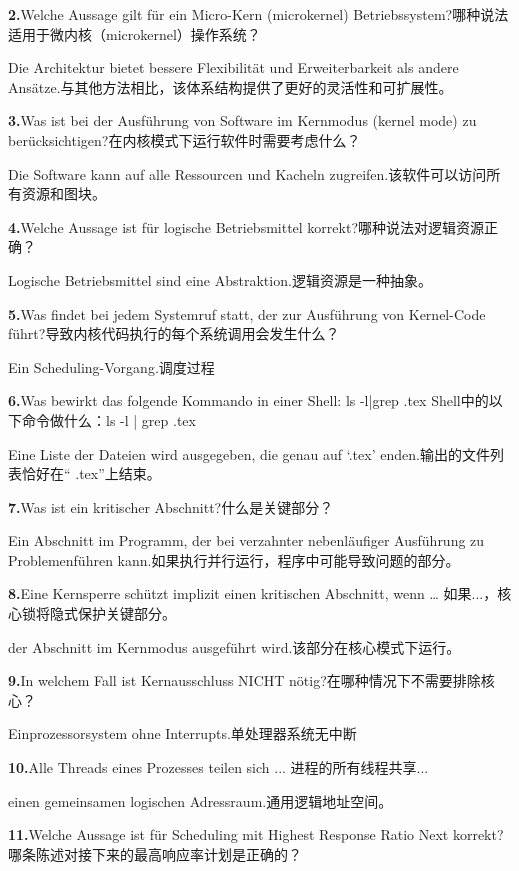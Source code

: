\documentclass[fleqn]{article}
\begin{document}
\textbf{2.}Welche Aussage gilt für ein Micro-Kern (microkernel) Betriebssystem?哪种说法适用于微内核（microkernel）操作系统？

Die Architektur bietet bessere Flexibilität und Erweiterbarkeit als andere Ansätze.与其他方法相比，该体系结构提供了更好的灵活性和可扩展性。

\textbf{3.}Was ist bei der Ausführung von Software im Kernmodus (kernel mode) zu berücksichtigen?在内核模式下运行软件时需要考虑什么？

Die Software kann auf alle Ressourcen und Kacheln zugreifen.该软件可以访问所有资源和图块。

\textbf{4.}Welche Aussage ist für logische Betriebsmittel korrekt?哪种说法对逻辑资源正确？

Logische Betriebsmittel sind eine Abstraktion.逻辑资源是一种抽象。

\textbf{5.}Was findet bei jedem Systemruf statt, der zur Ausführung von Kernel-Code führt?导致内核代码执行的每个系统调用会发生什么？

Ein Scheduling-Vorgang.调度过程

\textbf{6.}Was bewirkt das folgende Kommando in einer Shell: ls -l|grep .tex  Shell中的以下命令做什么：ls -l | grep .tex

Eine Liste der Dateien wird ausgegeben, die genau auf ‘.tex’ enden.输出的文件列表恰好在“ .tex”上结束。

\textbf{7.}Was ist ein kritischer Abschnitt?什么是关键部分？

Ein Abschnitt im Programm, der bei verzahnter nebenläufiger Ausführung zu Problemenführen kann.如果执行并行运行，程序中可能导致问题的部分。

\textbf{8.}Eine Kernsperre schützt implizit einen kritischen Abschnitt, wenn … 如果...，核心锁将隐式保护关键部分。

der Abschnitt im Kernmodus ausgeführt wird.该部分在核心模式下运行。

\textbf{9.}In welchem Fall ist Kernausschluss NICHT nötig?在哪种情况下不需要排除核心？

Einprozessorsystem ohne Interrupts.单处理器系统无中断

\textbf{10.}Alle Threads eines Prozesses teilen sich ...  进程的所有线程共享...

einen gemeinsamen logischen Adressraum.通用逻辑地址空间。

\textbf{11.}Welche Aussage ist für Scheduling mit Highest Response Ratio Next korrekt?哪条陈述对接下来的最高响应率计划是正确的？
\end{document}
